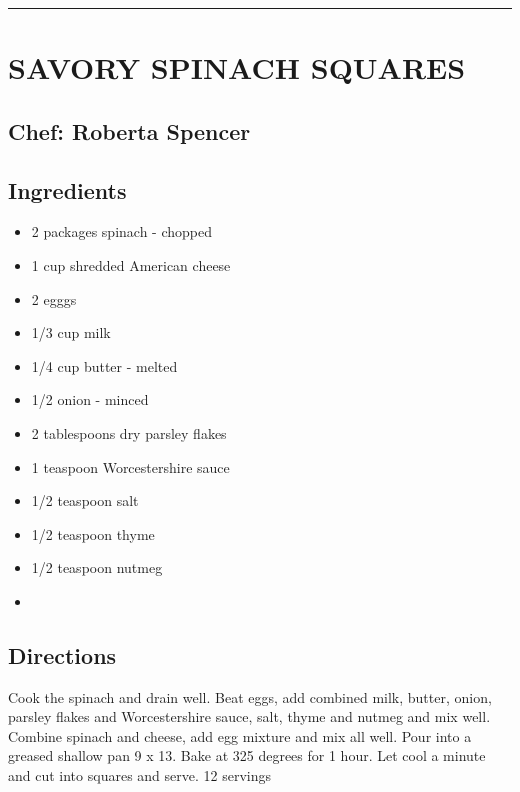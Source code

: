 \documentclass[
]{book}
\begin{document}
\begin{center}\rule{0.5\linewidth}{0.5pt}\end{center}

\hypertarget{savory-spinach-squares}{%
\section*{SAVORY SPINACH SQUARES}\label{savory-spinach-squares}}


\hypertarget{chef-roberta-spencer-11}{%
\subsection*{Chef: Roberta Spencer}\label{chef-roberta-spencer-11}}


\hypertarget{ingredients-37}{%
\subsection*{Ingredients}\label{ingredients-37}}


\begin{itemize}
\item
  2 packages spinach - chopped
\item
  1 cup shredded American cheese
\item
  2 egggs
\item
  1/3 cup milk
\item
  1/4 cup butter - melted
\item
  1/2 onion - minced
\item
  2 tablespoons dry parsley flakes
\item
  1 teaspoon Worcestershire sauce
\item
  1/2 teaspoon salt
\item
  1/2 teaspoon thyme
\item
  1/2 teaspoon nutmeg
\item
\end{itemize}

\hypertarget{directions-37}{%
\subsection*{Directions}\label{directions-37}}


Cook the spinach and drain well. Beat eggs, add combined milk, butter,
onion, parsley flakes and Worcestershire sauce, salt, thyme and nutmeg
and mix well. Combine spinach and cheese, add egg mixture and mix all well.
Pour into a greased shallow pan 9 x 13. Bake at 325 degrees for 1 hour.
Let cool a minute and cut into squares and serve. 12 servings
\end{document}
